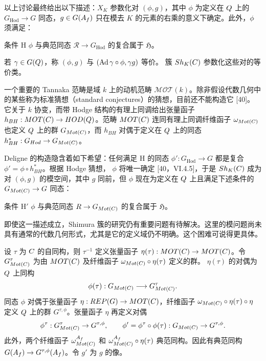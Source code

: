 以上讨论最终给出以下描述：$X_K$ 参数化对 $(\phi,g)$，其中
$\phi$ 为定义在 $Q$ 上的 $G_{\operatorname{Hod}}\to G$ 同态，$g\in G(A_f)$ 只在模去
$K$ 的元素的右乘的意义下确定。此外，$\phi$ 须满足：
\begin{originaltheorem}{条件 H}
$\phi$ 与典范同态 $\mathcal R\to G_{\operatorname{Hod}}$ 的复合属于 $\mathfrak H$。
\end{originaltheorem}
若 $\gamma\in G(Q)$，称 $(\phi,g)$ 与 $(\Ad\gamma\circ\phi,\gamma g)$ 等价。
簇 $Sh_K(C)$ 参数化这些对的等价类。

一个重要的 Tannaka 范畴是域 $k$ 上的动机范畴 $\mathcal{MOT}(k)$。除非假设代数几何中的某些称为标准猜想（standard conjectures）的猜想，目前还不能构造它 [40]。
它关于 $k$ 协变，而带 Hodge 结构的有理上同调给出张量函子
$h_{BH}:MOT(C)\to HOD(Q)$。范畴
$MOT(C)$ 连同有理上同调纤维函子 $\omega_{Mot(C)}$ 也定义
$Q$ 上的群 $G_{Mot(C)}$，而 $h_{BH}$ 对偶于定义在 $Q$ 上的同态
$h_{BH}^*:G_{Hod}\to G_{Mot(C)}$。

Deligne 的构造隐含着如下希望：任何满足 H 的同态
$\phi':G_{\operatorname{Hod}}\to G$ 都是复合 $\phi'=\phi\circ h_{BH}^*$。根据 Hodge 猜想，
$\phi$ 将唯一确定 [40，VI.4.5]，于是 $Sh_K(C)$ 成为对
$(\phi,g)$ 的模空间，其中 $g$ 同前，但 $\phi$ 现在为定义在 $Q$ 上且满足下述条件的
$G_{Mot(C)}\to G$ 同态：
\begin{originaltheorem}{条件 H$'$}
$\phi$ 与典范同态 $R\to G_{Mot(C)}$ 的复合属于 $\mathfrak H$。
\end{originaltheorem}
即使这一描述成立，Shimura 簇的研究仍有重要问题有待解决。这里的模问题尚未具有通常的代数几何形式，尤其是它的定义域仍不明确。这个困难可说得更具体。

设 $\tau$ 为 $C$ 的自同构，则 $\tau^{-1}$ 定义张量函子
$\eta(\tau):MOT(C)\to MOT(C)$。令
$G_{Mot(C)}^\tau$ 为由 $MOT(C)$ 及纤维函子
$\omega_{Mot(C)}\circ\eta(\tau)$ 定义的群。
$\eta(\tau)$ 的对偶为 $Q$ 上同构
\[
\phi(\tau):G_{Mot(C)}\longrightarrow G_{Mot(C)}^\tau.
\]
同态 $\phi$ 对偶于张量函子 $\eta:REP(G)\to MOT(C)$，纤维函子
$\omega_{Mot(C)}\circ\eta(\tau)\circ\eta$ 定义 $Q$ 上的群
$G^{\tau,\phi}$。张量函子 $\eta$ 再定义对偶
\[
\phi^\tau:G_{Mot(C)}^\tau\to G^{\tau,\phi},
\qquad\phi'=\phi^\tau\circ\phi(\tau):G_{Mot(C)}\to G^{\tau,\phi}.
\]
此外，两个纤维函子 $\omega_{Mot(C)}^{A_f}$ 和
$\omega_{Mot(C)}^{A_f}\circ\eta(\tau)$ 典范同构。因此有典范同构
$G(A_f)\to G^{\tau,\phi}(A_f)$。令 $g'$ 为 $g$ 的像。

